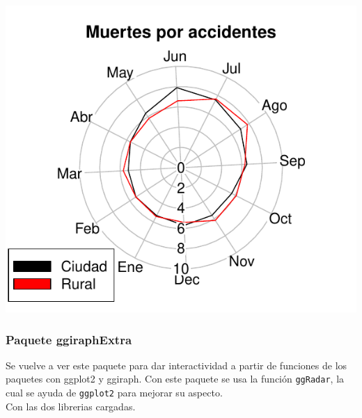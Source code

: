 \documentclass{article}\usepackage[]{graphicx}\usepackage[]{color}
\makeatletter
\def\maxwidth{ %
  \ifdim\Gin@nat@width>\linewidth
    \linewidth
  \else
    \Gin@nat@width
  \fi
}
\newenvironment{knitrout}{}{} %
\makeatother
\begin{document}
\begin{knitrout}
\color{fgcolor}

{\centering \includegraphics[width=\maxwidth]{figure/plot_plotrix_2-1} 

}



\end{knitrout}
\subsubsection{Paquete ggiraphExtra}
Se vuelve a ver este paquete %
para dar interactividad a partir de funciones de los paquetes con ggplot2 y ggiraph.
Con este paquete se usa la funci\'on \texttt{ggRadar}, la cual se ayuda de \texttt{ggplot2} para mejorar su aspecto.~\\
Con las dos librerias cargadas.
\end{document}
